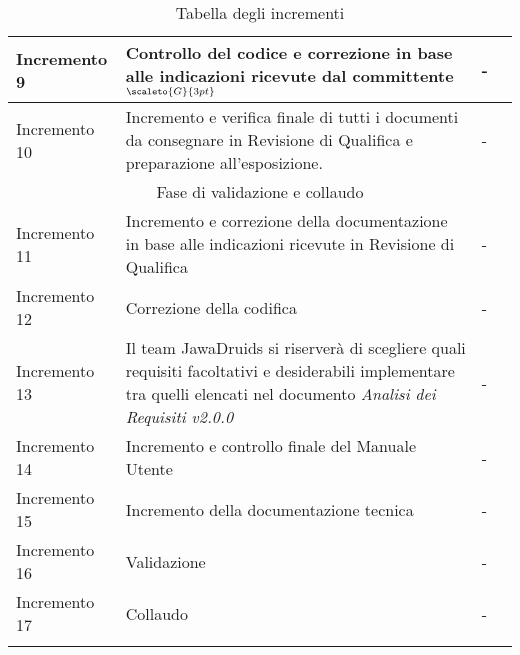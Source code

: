 \begin{center}
\begin{longtable}[c]{p{3cm}|p{5cm}|p{4cm}|p{3cm}}
		\hline
		\centering Incremento 9 & \centering Controllo del codice e correzione in base alle indicazioni ricevute dal committente$_{\scaleto{G}{3pt}}$ & \centering - & \makecell[tc]{-} \\
		\hline
		\centering Incremento 10 & \centering Incremento e verifica finale di tutti i documenti da consegnare in Revisione di Qualifica e preparazione all'esposizione. & \centering - & \makecell[tc]{-} \\
		\hline
		\multicolumn{4}{|c|}{Fase di validazione e collaudo}\\
		\hline
		\centering Incremento 11 & \centering Incremento e correzione della documentazione in base alle indicazioni ricevute in Revisione di Qualifica & \centering - & \makecell[tc]{-} \\
		\hline
		\centering Incremento 12 & \centering  Correzione della codifica  & \centering - & \makecell[tc]{-} \\
		\hline
		\centering Incremento 13 & \centering Il team JawaDruids si riserverà di scegliere quali requisiti facoltativi e desiderabili implementare tra quelli elencati nel documento \textit{Analisi dei Requisiti v2.0.0} & \centering - & \makecell[tc]{-} \\
		\hline
		\centering Incremento 14 & \centering Incremento e controllo finale del Manuale Utente & \centering - & \makecell[tc]{-} \\
		\hline
		\centering Incremento 15 & \centering Incremento della documentazione tecnica & \centering - & \makecell[tc]{-} \\
		\hline
		\centering Incremento 16 & \centering Validazione & \centering - & \makecell[tc]{-} \\
		\hline
		\centering Incremento 17 & \centering Collaudo & \centering - & \makecell[tc]{-} \\
		\hline
		\rowcolor{white}
		\caption[\textbf{Tabella degli incrementi}]{Tabella degli incrementi}\label{qua va in base alle label di altre tabelle mi sa}
	\end{longtable}
\end{center}
